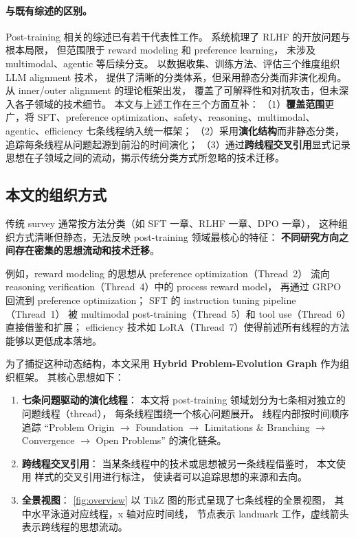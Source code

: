 \paragraph{与既有综述的区别。}
Post-training 相关的综述已有若干代表性工作。
\citet{casper2023rlhfproblems} 系统梳理了 RLHF 的开放问题与根本局限，
但范围限于 reward modeling 和 preference learning，
未涉及 multimodal、agentic 等后续分支。
\citet{wang2023alignsurvey} 以数据收集、训练方法、评估三个维度组织 LLM alignment 技术，
提供了清晰的分类体系，但采用静态分类而非演化视角。
\citet{shen2023alignmentsurvey} 从 inner/outer alignment 的理论框架出发，
覆盖了可解释性和对抗攻击，但未深入各子领域的技术细节。
本文与上述工作在三个方面互补：
（1）\textbf{覆盖范围}更广，将 SFT、preference optimization、safety、reasoning、multimodal、agentic、efficiency 七条线程纳入统一框架；
（2）采用\textbf{演化结构}而非静态分类，追踪每条线程从问题起源到前沿的时间演化；
（3）通过\textbf{跨线程交叉引用}显式记录思想在子领域之间的流动，揭示传统分类方式所忽略的技术迁移。

\subsection{本文的组织方式}
\label{sec:t0-organization}

传统 survey 通常按方法分类（如 SFT 一章、RLHF 一章、DPO 一章），
这种组织方式清晰但静态，无法反映 post-training 领域最核心的特征：
\textbf{不同研究方向之间存在密集的思想流动和技术迁移}。

例如，reward modeling 的思想从 preference optimization（Thread~2）
流向 reasoning verification（Thread~4）中的 process reward model，
再通过 GRPO 回流到 preference optimization；
SFT 的 instruction tuning pipeline（Thread~1）
被 multimodal post-training（Thread~5）和 tool use（Thread~6）直接借鉴和扩展；
efficiency 技术如 LoRA（Thread~7）使得前述所有线程的方法能够以更低成本落地。

为了捕捉这种动态结构，本文采用 \textbf{Hybrid Problem-Evolution Graph} 作为组织框架。
其核心思想如下：

\begin{enumerate}[leftmargin=2em]
  \item \textbf{七条问题驱动的演化线程}：
    本文将 post-training 领域划分为七条相对独立的问题线程（thread），
    每条线程围绕一个核心问题展开。
    线程内部按时间顺序追踪
    ``Problem Origin $\rightarrow$ Foundation $\rightarrow$ Limitations \& Branching $\rightarrow$ Convergence $\rightarrow$ Open Problems''
    的演化链条。

  \item \textbf{跨线程交叉引用}：
    当某条线程中的技术或思想被另一条线程借鉴时，
    本文使用  样式的交叉引用进行标注，
    使读者可以追踪思想的来源和去向。

  \item \textbf{全景视图}：
    \cref{fig:overview} 以 TikZ 图的形式呈现了七条线程的全景视图，
    其中水平泳道对应线程，x 轴对应时间线，
    节点表示 landmark 工作，虚线箭头表示跨线程的思想流动。
\end{enumerate}


